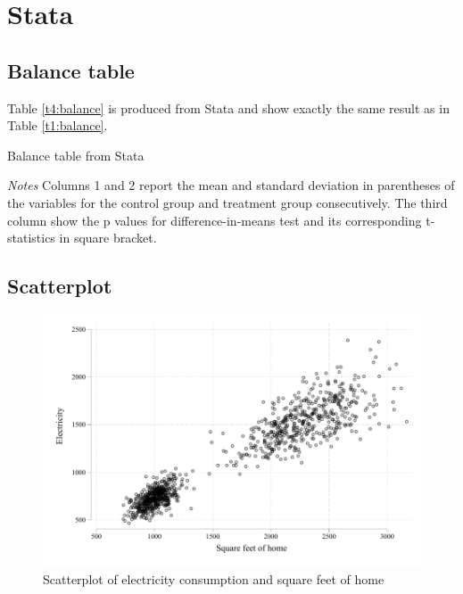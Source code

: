 \documentclass{article}
\begin{document}
\section{Stata}

\subsection{Balance table}

\begin{table}[H]\centering
Table \ref{t4:balance} is produced from Stata and show exactly the same result as in Table \ref{t1:balance}.

\begin{threeparttable}
    \caption{Balance table from Stata}
    \label{t4:balance}
    
    \begin{tablenotes}
    \small \item \textit{Notes} Columns 1 and 2 report the mean and standard deviation in parentheses of the variables for the control group and treatment group consecutively. The third column show the p values for difference-in-means test and its corresponding t-statistics in square bracket.
    \end{tablenotes}
\end{threeparttable}
\end{table}

\subsection{Scatterplot}

\begin{figure}[H]
    \centering
    \includegraphics[scale = 1]{./figure/twoway.pdf}
    \caption{Scatterplot of electricity consumption and square feet of home}
    \label{f2:twoway}
\end{figure}
\end{document}
